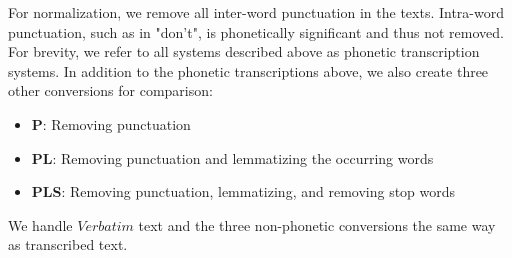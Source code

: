 For normalization, we remove all inter-word punctuation in the texts.
Intra-word punctuation, such as in "don't", is phonetically significant and thus not removed.
For brevity, we refer to all systems described above as phonetic transcription systems.
In addition to the phonetic transcriptions above, we also create three other conversions for comparison:
\begin{itemize}
  \item \textbf{P}: Removing punctuation
  \item \textbf{PL}: Removing punctuation and lemmatizing the occurring words
  \item \textbf{PLS}: Removing punctuation, lemmatizing, and removing stop words
\end{itemize}
We handle $Verbatim$ text and the three non-phonetic conversions the same way as transcribed text.



